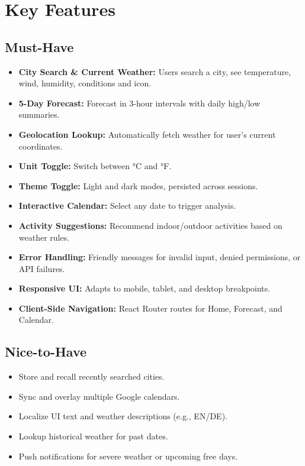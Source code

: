 \documentclass[12pt,a4paper]{article}
\begin{document}

\section{Key Features}

\subsection*{Must-Have}
\begin{itemize}[nosep]
  \item \textbf{City Search \& Current Weather:} Users search a city, see temperature, wind, humidity, conditions and icon.
  \item \textbf{5-Day Forecast:} Forecast in 3-hour intervals with daily high/low summaries.
  \item \textbf{Geolocation Lookup:} Automatically fetch weather for user’s current coordinates.
  \item \textbf{Unit Toggle:} Switch between °C and °F.
  \item \textbf{Theme Toggle:} Light and dark modes, persisted across sessions.
  \item \textbf{Interactive Calendar:} Select any date to trigger analysis.
  \item \textbf{Activity Suggestions:} Recommend indoor/outdoor activities based on weather rules.
  \item \textbf{Error Handling:} Friendly messages for invalid input, denied permissions, or API failures.
  \item \textbf{Responsive UI:} Adapts to mobile, tablet, and desktop breakpoints.
  \item \textbf{Client-Side Navigation:} React Router routes for Home, Forecast, and Calendar.
\end{itemize}

\subsection*{Nice-to-Have}
\begin{itemize}[nosep]
  \item Store and recall recently searched cities.
  \item Sync and overlay multiple Google calendars.
  \item Localize UI text and weather descriptions (e.g., EN/DE).
  \item Lookup historical weather for past dates.
  \item Push notifications for severe weather or upcoming free days.
\end{itemize}
\end{document}
